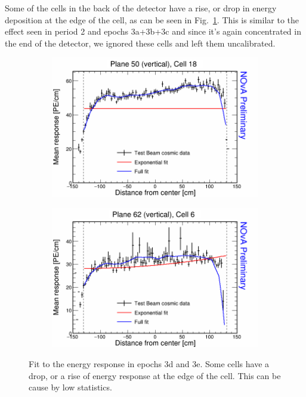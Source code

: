 Some of the cells in the back of the detector have a rise, or drop in energy deposition at the edge of the cell, as can be seen in Fig.~\ref{fig:AttenfitResultsEpoch3de_CellEdges}. This is similar to the effect seen in period 2 and epochs 3a+3b+3c and since it's again concentrated in the end of the detector, we ignored these cells and left them uncalibrated.

\begin{figure}[h]
  \begin{subfigure}{0.495\textwidth}
    \includegraphics[width=\linewidth]{Plots/RelativeCalibrationResults/ep3de_050_018.png}
  \end{subfigure}
  \begin{subfigure}{0.495\textwidth}
    \includegraphics[width=\linewidth]{Plots/RelativeCalibrationResults/ep3de_062_006.png}
  \end{subfigure}
  \caption[Attenuation fits for cells with large fluctuations in period 3 data]{Fit to the energy response in epochs 3d and 3e. Some cells have a drop, or a rise of energy response at the edge of the cell. This can be cause by low statistics.}
  \label{fig:AttenfitResultsEpoch3de_CellEdges}
\end{figure}

